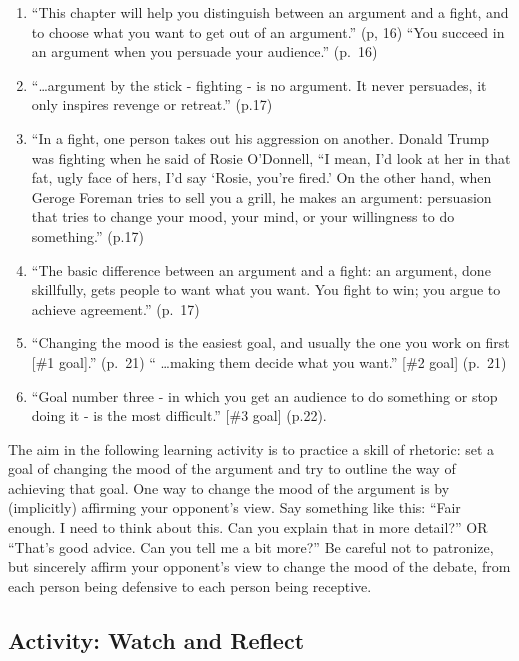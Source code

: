 \documentclass[
]{book}
\providecommand{\tightlist}{%
  \setlength{\itemsep}{0pt}\setlength{\parskip}{0pt}}
\begin{document}
\begin{enumerate}
\def\labelenumi{\arabic{enumi}.}
\tightlist
\item
  ``This chapter will help you distinguish between an argument and a fight, and to choose what you want to get out of an argument.'' (p, 16) ``You succeed in an argument when you persuade your audience.'' (p.~16)\\
\item
  ``\ldots argument by the stick - fighting - is no argument. It never persuades, it only inspires revenge or retreat.'' (p.17)\\
\item
  ``In a fight, one person takes out his aggression on another. Donald Trump was fighting when he said of Rosie O'Donnell, ``I mean, I'd look at her in that fat, ugly face of hers, I'd say `Rosie, you're fired.' On the other hand, when Geroge Foreman tries to sell you a grill, he makes an argument: persuasion that tries to change your mood, your mind, or your willingness to do something.'' (p.17)\\
\item
  ``The basic difference between an argument and a fight: an argument, done skillfully, gets people to want what you want. You fight to win; you argue to achieve agreement.'' (p.~17)\\
\item
  ``Changing the mood is the easiest goal, and usually the one you work on first {[}\#1 goal{]}.'' (p.~21) `` \ldots making them decide what you want.'' {[}\#2 goal{]} (p.~21)\\
\item
  ``Goal number three - in which you get an audience to do something or stop doing it - is the most difficult.'' {[}\#3 goal{]} (p.22).
\end{enumerate}

The aim in the following learning activity is to practice a skill of rhetoric: set a goal of changing the mood of the argument and try to outline the way of achieving that goal. One way to change the mood of the argument is by (implicitly) affirming your opponent's view. Say something like this: ``Fair enough. I need to think about this. Can you explain that in more detail?'' OR ``That's good advice. Can you tell me a bit more?'' Be careful not to patronize, but sincerely affirm your opponent's view to change the mood of the debate, from each person being defensive to each person being receptive.

\hypertarget{activity-watch-and-reflect-5}{%
\subsection*{Activity: Watch and Reflect}\label{activity-watch-and-reflect-5}}
\end{document}
